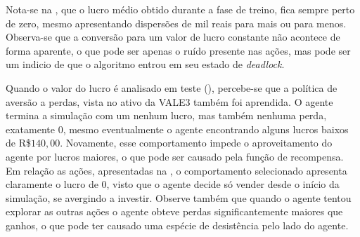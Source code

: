 Nota-se na , que o lucro médio obtido durante a fase de treino, fica sempre perto de zero, mesmo apresentando dispersões de mil reais para mais ou para menos. Observa-se que a conversão para um valor de lucro constante não acontece de forma aparente, o que pode ser apenas o ruído presente nas ações, mas pode ser um indicio de que o algoritmo entrou em seu estado de \emph{deadlock}.


Quando o valor do lucro é analisado em teste (), percebe-se que a política de aversão a perdas, vista no ativo da VALE3 também foi aprendida. O agente termina a simulação com um nenhum lucro, mas também nenhuma perda, exatamente $0$, mesmo eventualmente o agente encontrando alguns lucros baixos de R\$$140,00$. Novamente, esse comportamento impede o aproveitamento do agente por lucros maiores, o que pode ser causado pela função de recompensa. Em relação as ações, apresentadas na , o comportamento selecionado apresenta claramente o lucro de $0$, visto que o agente decide só vender desde o início da simulação, se avergindo a investir. Observe também que quando o agente tentou explorar as outras ações o agente obteve perdas significantemente maiores que ganhos, o que pode ter causado uma espécie de desistência pelo lado do agente. 

